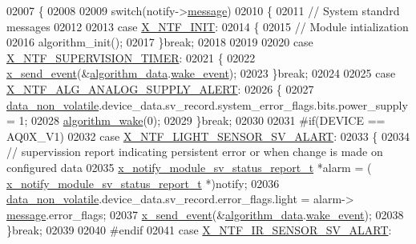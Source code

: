 \begin{DoxyCode}
02007 \{
02008 
02009     \textcolor{keywordflow}{switch}(notify->\hyperlink{a00036_adf9665938515a20c283eea2c978cf80d}{message})
02010     \{
02011         \textcolor{comment}{// System standrd messages }
02012 
02013         \textcolor{keywordflow}{case} \hyperlink{a00036_a620b808f2d7b8d2a03c4d026a4c5423c}{X\_NTF\_INIT}:
02014         \{
02015             \textcolor{comment}{// Module intialization    }
02016             algorithm\_init();            
02017         \}\textcolor{keywordflow}{break};
02018 
02019 
02020         \textcolor{keywordflow}{case} \hyperlink{a00016_aededd1ab0a512a03f6cb0d3459b254e1}{X\_NTF\_SUPERVISION\_TIMER}:
02021         \{
02022            \hyperlink{a00036_a4bc3d03c8d62c8237329ed4e969fbc1b}{x\_send\_event}(&\hyperlink{a00038_a183caa40cd01e79ee309cc9c4a225197}{algorithm\_data}.\hyperlink{a00016_ad6a897cbacf5ae6902272ee198d5cd23}{wake\_event});
02023         \}\textcolor{keywordflow}{break};
02024 
02025         \textcolor{keywordflow}{case}  \hyperlink{a00021_a5c8025c00c22190bf4b4c4fe87123f55}{X\_NTF\_ALG\_ANALOG\_SUPPLY\_ALERT}:            
02026         \{
02027             \hyperlink{a00060_a76ac5f917f5308dcd83de0d7c94559fb}{data\_non\_volatile}.device\_data.sv\_record.system\_error\_flags.bits.power\_supply =
       1;
02028             \hyperlink{a00038_a42ed16c7ef20e0c0031fe7ba7ae377b3}{algorithm\_wake}(0);
02029         \}\textcolor{keywordflow}{break};
02030 
02031 \textcolor{preprocessor}{#if(DEVICE == AQ0X\_V1)}
02032          \textcolor{keywordflow}{case}  \hyperlink{a00021_a472c0187f61238cdef62bf3d965df8e2}{X\_NTF\_LIGHT\_SENSOR\_SV\_ALART}:
02033         \{
02034             \textcolor{comment}{// supervission report indicating persistent error or when change is made on configured data}
02035             \hyperlink{a00021_d7/d1b/a00864}{x\_notify\_module\_sv\_status\_report\_t} *alarm = (
      \hyperlink{a00021_d7/d1b/a00864}{x\_notify\_module\_sv\_status\_report\_t} *)notify;
02036             \hyperlink{a00060_a76ac5f917f5308dcd83de0d7c94559fb}{data\_non\_volatile}.device\_data.sv\_record.error\_flags.light = alarm->
      \hyperlink{a00021_a13393a2d1589483b3bae4d2e79f43980}{message}.error\_flags;
02037              \hyperlink{a00036_a4bc3d03c8d62c8237329ed4e969fbc1b}{x\_send\_event}(&\hyperlink{a00038_a183caa40cd01e79ee309cc9c4a225197}{algorithm\_data}.\hyperlink{a00016_ad6a897cbacf5ae6902272ee198d5cd23}{wake\_event});
02038         \}\textcolor{keywordflow}{break};
02039 
02040 \textcolor{preprocessor}{#endif}
02041          \textcolor{keywordflow}{case}  \hyperlink{a00021_a0eb06525326cff5fc0fb38f141d6be8e}{X\_NTF\_IR\_SENSOR\_SV\_ALART}:

\end{DoxyCode}
